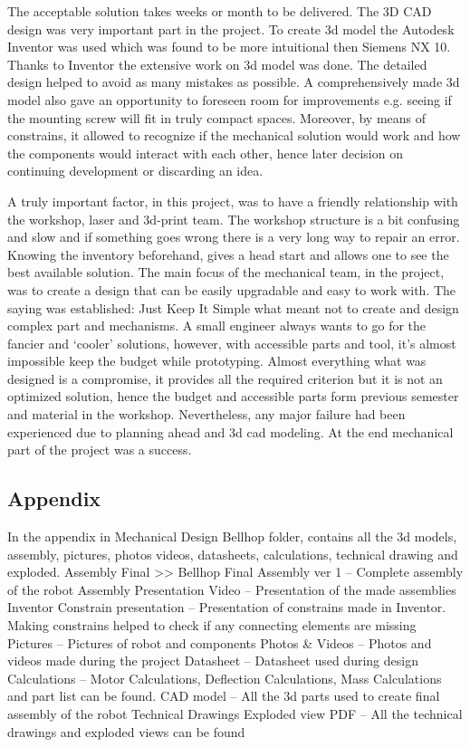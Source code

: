 \documentclass[11pt]{article}
\begin{document}
The acceptable solution takes weeks or month to be delivered.  The 3D CAD design was very important part in the project. To create 3d model the Autodesk Inventor was used which was found to be more intuitional then Siemens NX 10. Thanks to Inventor the extensive work on 3d model was done. The detailed design helped to avoid as many mistakes as possible. A comprehensively made 3d model also gave an opportunity to foreseen room for improvements e.g. seeing if the mounting screw will fit in truly compact spaces. Moreover, by means of constrains, it allowed to recognize if the mechanical solution would work and how the components would interact with each other, hence later decision on continuing development or discarding an idea.


A truly important factor, in this project, was to have a friendly relationship with the workshop, laser and 3d-print team. The workshop structure is a bit confusing and slow and if something goes wrong there is a very long way to repair an error. Knowing the inventory beforehand, gives a head start and allows one to see the best available solution. The main focus of the mechanical team, in the project, was to create a design that can be easily upgradable and easy to work with. The saying was established: Just Keep It Simple what meant not to create and design complex part and mechanisms. A small engineer always wants to go for the fancier and ‘cooler’ solutions, however, with accessible parts and tool, it’s almost impossible keep the budget while prototyping. Almost everything what was designed is a compromise, it provides all the required criterion but it is not an optimized solution, hence the budget and accessible parts form previous semester and material in the workshop. Nevertheless, any major failure had been experienced due to planning ahead and 3d cad modeling. At the end mechanical part of the project was a success.  


\subsection*{Appendix}
In the appendix in Mechanical Design Bellhop folder, contains all the 3d models, assembly, pictures, photos videos, datasheets, calculations, technical drawing and exploded. 
Assembly Final >> Bellhop Final Assembly ver 1 – Complete assembly of the robot
Assembly Presentation Video – Presentation of the made assemblies 
Inventor Constrain presentation – Presentation of constrains made in Inventor. Making constrains helped to check if any connecting elements are missing  
Pictures – Pictures of robot and components 
Photos \& Videos – Photos and videos made during the project
Datasheet – Datasheet used during design       
Calculations – Motor Calculations, Deflection Calculations, Mass Calculations and part list can be found. 
CAD model – All the 3d parts used to create final assembly of the robot
Technical Drawings Exploded view PDF – All the technical drawings and exploded views can be found
\end{document}
